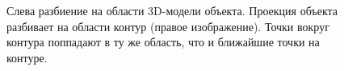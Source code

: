 \begin{figure}[t]
\centering
\begin{minipage}[h]{0.49\linewidth}
\end{minipage}
\hfill
\begin{minipage}[h]{0.49\linewidth}
\end{minipage}
\caption{Слева разбиение на области 3D-модели объекта. Проекция объекта
разбивает на области контур (правое изображение). Точки вокруг контура
поппадают в ту же область, что и ближайшие точки на контуре. }
\label{fig:projected-areas}
\end{figure}

